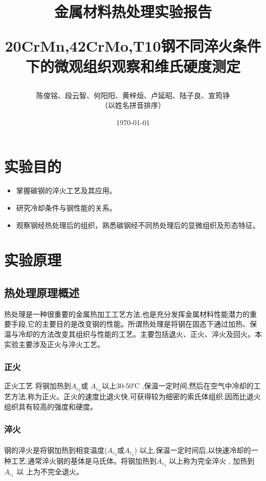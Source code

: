 \documentclass[12pt]{ctexart}
\begin{document}
\pagestyle{empty}
\title{ \bfseries 金属材料热处理实验报告\\
\begin{large}
20CrMn,42CrMo,T10钢不同淬火条件下的微观组织观察和维氏硬度测定
\end{large}}
\author{陈俊铭、段云智、何阳阳、黄梓烜、卢延昭、陆子良、宣筠铮\\（以姓名拼音排序）}
\date{\today}


\maketitle
\newpage
\thispagestyle{empty}
\tableofcontents
\newpage
\setcounter{page}{1}

\section{实验目的}
\begin{itemize}
\item 掌握碳钢的淬火工艺及其应用。
\item 研究冷却条件与钢性能的关系。
\item 观察钢经热处理后的组织，熟悉碳钢经不同热处理后的显微组织及形态特征。
\end{itemize}

\section{实验原理}
\subsection{热处理原理概述}
热处理是一种很重要的金属热加工工艺方法,也是充分发挥金属材料性能潜力的重要手段,它的主要目的是改变钢的性能。所谓热处理是将钢在固态下通过加热、保温与冷却的方法改变其组织与性能的工艺。主要包括退火、正火、淬火及回火。本实验主要涉及正火与淬火工艺。
\subsubsection{正火}
正火工艺 将钢加热到${A_{{c_3}}}$或 ${A_{{c_m}}}$以上30-50℃ ,保温一定时间,然后在空气中冷却的工艺方法,称为正火。正火的速度比退火快,可获得较为细密的索氏体组织,因而比退火组织具有较高的强度和硬度。
\subsubsection{淬火}
\paragraph{}
 钢的淬火是将钢加热到相变温度(${A_{{c_3}}}$或${A_{{c_1}}}$) 以上,保温一定时间后,以快速冷却的一种工艺,通常淬火钢的基体是马氏体。将钢加热到${A_{{c_3}}}$ 以上称为完全淬火 , 加热到${A_{{c_1}}}$ 以 上为不完全退火。
\end{document}
